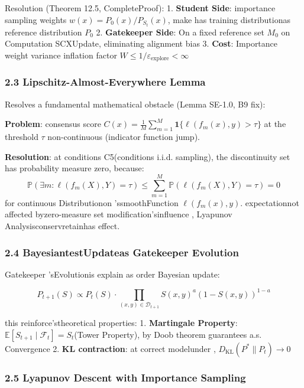 \documentclass[
  12pt,
]{article}
\begin{document}
Resolution (Theorem 12.5, CompleteProof): 1. \textbf{Student Side}: importance sampling weights
\(w(x) = P_0(x) / P_{S_t}(x)\), make has training distributionas reference distribution \(P_0\) 2.
\textbf{Gatekeeper Side}: On a fixed reference set \(M_0\) on Computation
SCXUpdate, eliminating alignment bias 3. \textbf{Cost}: Importance weight variance inflation factor
\(W \leq 1/\varepsilon_{\text{explore}} < \infty\)

\subsubsection{2.3 Lipschitz-Almost-Everywhere
Lemma}\label{lipschitz-almost-everywhere-ux5f15ux7406}

Resolves a fundamental mathematical obstacle (Lemma SE-1.0, B9 fix):

\textbf{Problem}: consensus score
\(C(x) = \frac{1}{M}\sum_{m=1}^M \mathbf{1}\{\ell(f_m(x), y) > \tau\}\)
at the threshold \(\tau\) non-continuous (indicator function jump). 

\textbf{Resolution}: at conditions C5(conditions i.i.d.
sampling), the discontinuity set has probability measure zero, because:
\[\mathbb{P}(\exists m: \ell(f_m(X), Y) = \tau) \leq \sum_{m=1}^M \mathbb{P}(\ell(f_m(X), Y) = \tau) = 0\]
for continuous Distributionon 'ssmoothFunction
\(\ell(f_m(x), y)\). expectationnot affected byzero-measure set modification'sinfluence , Lyapunov Analysisconservretainhas effect. 

\subsubsection{2.4 BayesiantestUpdateas  Gatekeeper
Evolution}\label{ux8d1dux53f6ux65afux540eux9a8cux66f4ux65b0ux4f5cux4e3a-Gatekeeper-ux8fdbux5316}

Gatekeeper 'sEvolutionis explain as order Bayesian update: 

\[P_{t+1}(S) \propto P_t(S) \cdot \prod_{(x,y) \in \mathcal{D}_{t+1}} S(x,y)^{a} (1 - S(x,y))^{1-a}\]

this reinforce'stheoretical properties:  1. \textbf{Martingale Property}:
\(\mathbb{E}[S_{t+1} \mid \mathcal{F}_t] = S_t\)(Tower Property), by  Doob
theorem guarantees a.s. Convergence 2. \textbf{KL contraction}:
at correct modelunder , \(D_{\text{KL}}(P^* \| P_t) \to 0\)

\subsubsection{2.5 Lyapunov
Descent with Importance Sampling}\label{lyapunov-ux4e0bux964dux4e0eux91cdux8981ux6027ux91c7ux6837}
\end{document}

